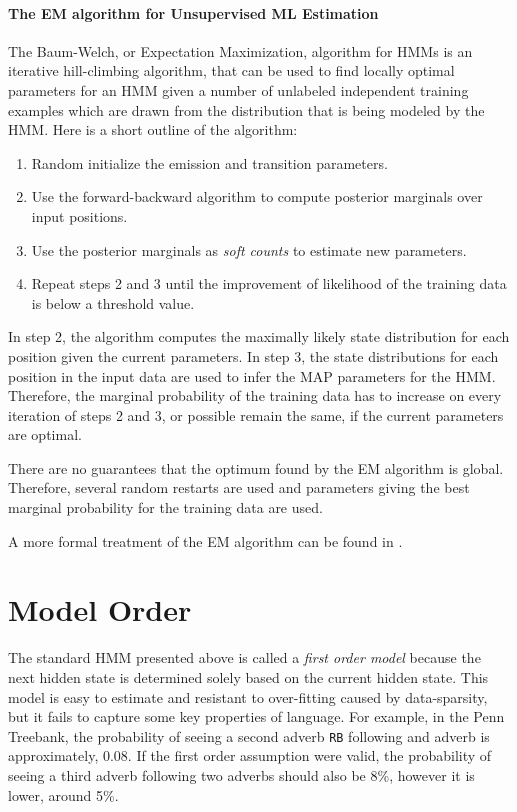 \paragraph{The EM algorithm for Unsupervised ML Estimation}
The Baum-Welch, or Expectation Maximization, algorithm for HMMs is an
iterative hill-climbing algorithm, that can be used to find locally
optimal parameters for an HMM given a number of unlabeled independent
training examples which are drawn from the distribution that is being
modeled by the HMM. Here is a short outline of the algorithm:
\begin{enumerate}
\item Random initialize the emission and transition parameters.
\item Use the forward-backward algorithm to compute posterior
  marginals over input positions.
\item Use the posterior marginals as {\it soft counts} to estimate new
  parameters.
\item Repeat steps 2 and 3 until the improvement of likelihood of the
  training data is below a threshold value.
\end{enumerate}

In step 2, the algorithm computes the maximally likely state
distribution for each position given the current parameters. In step
3, the state distributions for each position in the input data are
used to infer the MAP parameters for the HMM. Therefore, the marginal
probability of the training data has to increase on every iteration of
steps 2 and 3, or possible remain the same, if the current parameters
are optimal.

There are no guarantees that the optimum found by the EM algorithm is
global. Therefore, several random restarts are used and parameters
giving the best marginal probability for the training data are used. 

A more formal treatment of the EM algorithm can be found in \cite{Blimes1997}.

\section{Model Order}

The standard HMM presented above is called a {\it first order model}
because the next hidden state is determined solely based on the
current hidden state. This model is easy to estimate and resistant to
over-fitting caused by data-sparsity, but it fails to capture some key
properties of language. For example, in the Penn Treebank, the
probability of seeing a second adverb {\tt RB} following and adverb
is approximately, 0.08. If the first order assumption were valid, the
probability of seeing a third adverb following two adverbs should also
be 8\%, however it is lower, around 5\%.

